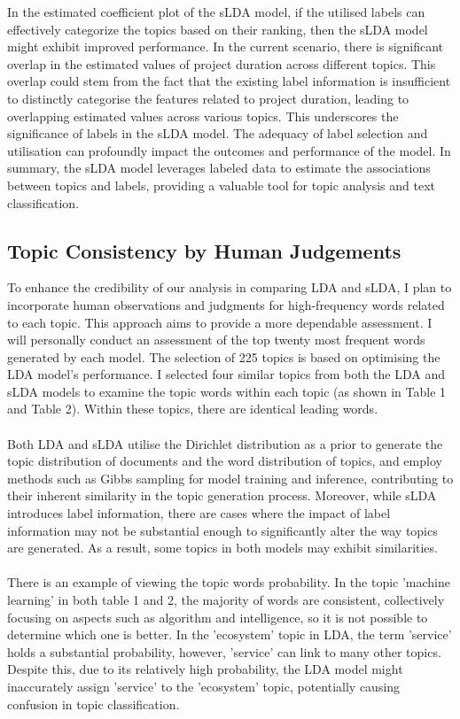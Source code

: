 \documentclass[12pt,twoside]{article}
\begin{document}
In the estimated coefficient plot of the sLDA model, if the utilised labels can effectively categorize the topics based on their ranking, then the sLDA model might exhibit improved performance. In the current scenario, there is significant overlap in the estimated values of project duration across different topics. This overlap could stem from the fact that the existing label information is insufficient to distinctly categorise the features related to project duration, leading to overlapping estimated values across various topics. This underscores the significance of labels in the sLDA model. The adequacy of label selection and utilisation can profoundly impact the outcomes and performance of the model. In summary, the sLDA model leverages labeled data to estimate the associations between topics and labels, providing a valuable tool for topic analysis and text classification.

\subsection{Topic Consistency by Human Judgements}
To enhance the credibility of our analysis in comparing LDA and sLDA, I
plan to incorporate human observations and judgments for high-frequency words related to each topic. This approach aims to provide a more dependable assessment. I will personally conduct an assessment of the top twenty most frequent words generated by each model. The selection of 225 topics is based on optimising the LDA model's performance. I selected four similar topics from both the LDA and sLDA models to examine the topic words within each topic (as shown in Table 1 and Table 2). Within these topics, there are identical leading words.\\\\

Both LDA and sLDA utilise the Dirichlet distribution as a prior to generate the topic distribution of documents and the word distribution of topics, and employ methods such as Gibbs sampling for model training and inference, contributing to their inherent similarity in the topic generation process. Moreover, while sLDA introduces label information, there are cases where the impact of label information may not be substantial enough to significantly alter the way topics are generated. As a result, some topics in both models may exhibit similarities.\\\\

There is an example of viewing the topic words probability. In the topic 'machine learning' in both table 1 and 2, the majority of words are consistent, collectively focusing on aspects such as algorithm and intelligence, so it is not possible to determine which one is better. In the 'ecosystem' topic in LDA, the term 'service' holds a substantial probability, however, 'service' can link to many other topics. Despite this, due to its relatively high probability, the LDA model might inaccurately assign 'service' to the 'ecosystem' topic, potentially causing confusion in topic classification.\\\\
\end{document}
